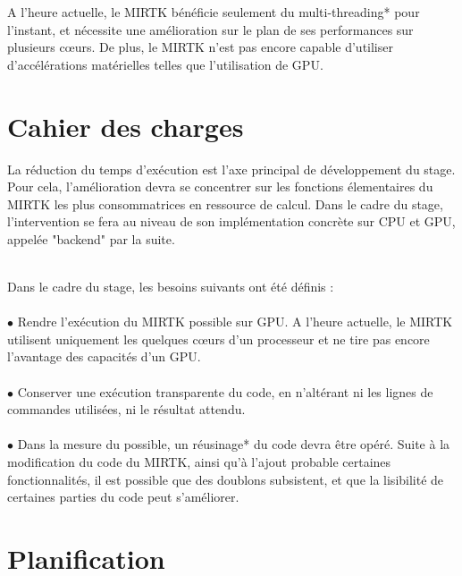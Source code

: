 \documentclass[10pt]{report}
\begin{document}
	A l'heure actuelle, le MIRTK bénéficie seulement du multi-threading* pour l'instant, et nécessite une amélioration sur le plan de ses performances sur plusieurs cœurs. De plus,  le MIRTK n'est pas encore capable d'utiliser d'accélérations matérielles telles que l'utilisation de GPU.
	\newpage
	\section{Cahier des charges}
	La réduction du temps d'exécution est l'axe principal de développement du stage. Pour cela, l'amélioration devra se concentrer sur les fonctions élementaires du MIRTK les plus consommatrices en ressource de calcul. Dans le cadre du stage, l'intervention se fera au niveau de son implémentation concrète sur CPU et GPU, appelée "backend" par la suite.\\ ~\par
	
	\noindent Dans le cadre du stage, les besoins suivants ont été définis : \\
	\\{$\bullet$} Rendre l'exécution du MIRTK possible sur GPU. A l'heure actuelle, le MIRTK utilisent uniquement les quelques cœurs d'un processeur et ne tire pas encore l'avantage des capacités d'un GPU.\\
	\\{$\bullet$} Conserver une exécution transparente du code, en n'altérant ni les lignes de commandes utilisées, ni le résultat attendu.  \\
	\\{$\bullet$} Dans la mesure du possible, un réusinage* du code devra être opéré. Suite à la modification du code du MIRTK, ainsi qu'à l'ajout probable certaines fonctionnalités, il est possible que des doublons subsistent, et que la lisibilité de certaines parties du code peut s'améliorer.	
	\section{Planification}
\end{document}
